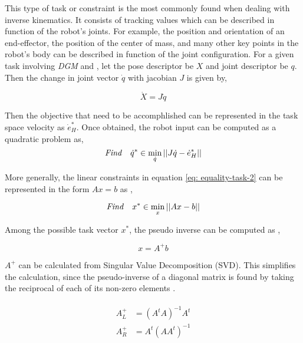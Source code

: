 This type of task or constraint is the most commonly found when dealing with inverse kinematics. It consists of tracking values which can be described in function 
of the robot’s joints. For example, the position and orientation of an end-effector, the position of the center of mass, and many other key points in 
the robot’s body can be described in function of the joint configuration. For a given task involving \textit{DGM} and , let the pose descriptor be $X$ and joint descriptor be $q$. Then the change in joint vector $\Dot{q}$ with jacobian $J$
 is given by,

 \begin{equation}
     \label{eq: equality-task}
    \dot{X} = J \dot{q}
 \end{equation}

Then the objective that need to be accomphlished can be represented in the task space velocity as $\dot{e}_H^*$. Once obtained, the robot input can be computed as a quadratic problem as,
\begin{equation}
    \label{eq: equality-task-2}
    \mathit{Find} \quad \dot{q}^*  \in \min_{\dot{q}} ||J\dot{q} - \dot{e}_H^*|| \\
\end{equation}

More generally, the linear constraints in equation \ref{eq: equality-task-2} can be represented in the form $Ax = b$ as \cite{escande2014hierarchical},

\begin{equation}
    \label{eq: equality-task-3}
    \mathit{Find} \quad x^*  \in \min_{x} ||Ax - b|| \\
\end{equation}

Among the possible task vector $x^*$, the pseudo inverse can be computed as ,

$$x = A^+b$$

$A^+$ can be calculated from Singular Value Decomposition (SVD).
This simplifies the calculation, since the pseudo-inverse of a diagonal matrix is found by taking the reciprocal of each of its non-zero elements \cite{louisepouble}.

\begin{align}
    \label{eq: SVD}
    \begin{split}
        A^+_L &= (A^tA)^{-1}A^t \\
        A^+_R &= A^t(AA^t)^{-1}     
    \end{split}
\end{align}

